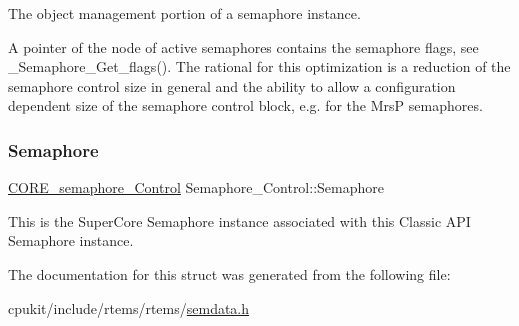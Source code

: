 The object management portion of a semaphore instance. 

A pointer of the node of active semaphores contains the semaphore flags, see \+\_\+\+Semaphore\+\_\+\+Get\+\_\+flags(). The rational for this optimization is a reduction of the semaphore control size in general and the ability to allow a configuration dependent size of the semaphore control block, e.\+g. for the MrsP semaphores. \mbox{\label{structSemaphore__Control_a415970ccb41ee900c5b77cc060f51932}} 
\subsubsection{\texorpdfstring{Semaphore}{Semaphore}}
{\footnotesize\ttfamily \mbox{\hyperlink{structCORE__semaphore__Control}{C\+O\+R\+E\+\_\+semaphore\+\_\+\+Control}} Semaphore\+\_\+\+Control\+::\+Semaphore}

This is the Super\+Core Semaphore instance associated with this Classic A\+PI Semaphore instance. 

The documentation for this struct was generated from the following file\+:\begin{DoxyCompactItemize}
\item 
cpukit/include/rtems/rtems/\mbox{\hyperlink{semdata_8h}{semdata.\+h}}\end{DoxyCompactItemize}
